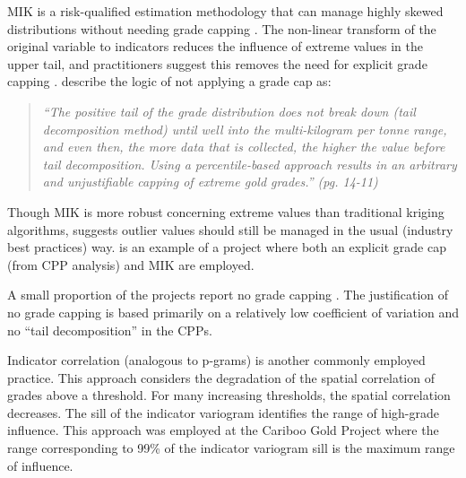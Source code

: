 \Gls{MIK} is a risk-qualified estimation methodology that can manage highly skewed distributions without needing grade capping \citep{journel1983nonparametric}. The non-linear transform of the original variable to indicators reduces the influence of extreme values in the upper tail, and practitioners suggest this removes the need for explicit grade capping \citep{pretium2020, ngm2020, tristar2021, cardinal2019}. \cite{pretium2020} describe the logic of not applying a grade cap as:

\blockquote{\textit{``The positive tail of the grade distribution does
        not break down (tail decomposition method) until well into the multi-kilogram per tonne range, and even then, the more data that is collected, the higher the value before tail decomposition. Using a percentile-based approach results in an arbitrary and unjustifiable capping of extreme gold grades.'' (pg. 14-11)}}

Though \gls{MIK} is more robust concerning extreme values than traditional kriging algorithms, \cite{carvalho2017overview} suggests outlier values should still be managed in the usual (industry best practices) way. \cite{artemis2020} is an example of a project where both an explicit grade cap (from \gls{CPP} analysis) and \gls{MIK} are employed.

A small proportion of the projects report no grade capping \citep{medgold2021,pasofino2020,eldorado2020}. The justification of no grade capping is based primarily on a relatively low coefficient of variation and no ``tail decomposition'' in the \glspl{CPP}.


Indicator correlation (analogous to p-grams) is another commonly employed practice. This approach considers the degradation of the spatial correlation of grades above a threshold. For many increasing thresholds, the spatial correlation decreases. The sill of the indicator variogram identifies the range of high-grade influence. This approach was employed at the Cariboo Gold Project \citep{osiko2020} where the range corresponding to 99\% of the indicator variogram sill is the maximum range of influence.

